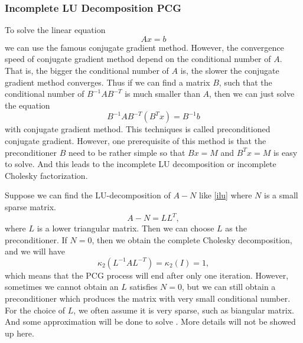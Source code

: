 \documentclass[english, nochinese]{pkupaper}
\begin{document}
\subsubsection{Incomplete LU Decomposition PCG}
\par To solve the linear equation 
\begin{equation}
	Ax = b
\end{equation}
we can use the famous conjugate gradient method. However, the convergence speed of conjugate gradient method depend on the conditional number of $A$. That is, the bigger the conditional number of $A$ is, the slower the conjugate gradient method converges. Thus if we can find a matrix $B$, such that the conditional number of $B^{-1}AB^{-T}$ is much smaller than $A$, then we can just solve the equation
\begin{equation}
	B^{-1}AB^{-T}(B^Tx) = B^{-1}b
\end{equation}
with conjugate gradient method. This techniques is called preconditioned conjugate gradient. However, one prerequisite of this method is that the preconditioner $B$ need to be rather simple so that $Bx = M$ and $B^Tx = M$ is easy to solve. And this leads to the incomplete LU decomposition or incomplete Cholesky factorization.
\par Suppose we can find the LU-decomposition of $A - N$ like \eqref{ilu} where $N$ is a small sparse matrix.
\begin{equation}\label{ilu}
	A - N = LL^T,
\end{equation}
where $L$ is a lower triangular matrix. Then we can choose $L$ as the preconditioner. If $N = 0$, then we obtain the complete Cholesky decomposition, and we will have
\begin{equation}
	\kappa_2(L^{-1}AL^{-T}) = \kappa_2(I) = 1,
\end{equation}
which means that the PCG process will end after only one iteration. However, sometimes we cannot obtain an $L$ satisfies $N = 0$, but we can still obtain a preconditioner which produces the matrix with very small conditional number. For the choice of $L$, we often assume it is very sparse, such as biangular matrix. And some approximation will be done to solve \label{ilu}. More details will not be showed up here.
\end{document}
